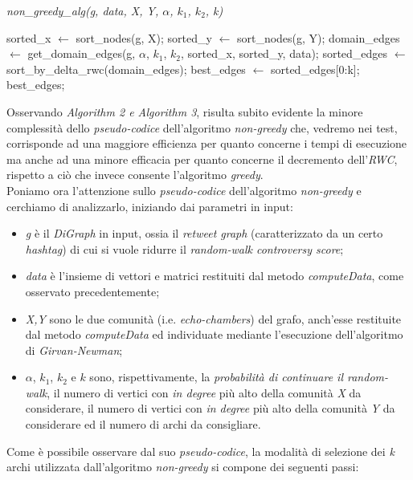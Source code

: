 \begin{algorithm}
\caption{\textit{non\_greedy\_alg(g, data, X, Y, $\alpha$, $k_1$, $k_2$, k)}}
\begin{algorithmic} 
\STATE sorted\_x $\leftarrow$ sort\_nodes(g, X); 
\STATE sorted\_y $\leftarrow$ sort\_nodes(g, Y);
\STATE domain\_edges $\leftarrow$ get\_domain\_edges(g, $\alpha$, $k_1$, $k_2$, sorted\_x, sorted\_y, data);
\STATE sorted\_edges $\leftarrow$ sort\_by\_delta\_rwc(domain\_edges);
\STATE best\_edges $\leftarrow$ sorted\_edges[0:k];
\RETURN best\_edges;
\end{algorithmic}
\end{algorithm}

Osservando \textit{Algorithm 2 e Algorithm 3}, risulta subito evidente la minore complessità dello \textit{pseudo-codice} dell'algoritmo \textit{non-greedy} che, vedremo nei test, corrisponde ad una maggiore efficienza per quanto concerne i tempi di esecuzione ma anche ad una minore efficacia per quanto concerne il decremento dell'\textit{RWC}, rispetto a ciò che invece consente l'algoritmo \textit{greedy}.
\\Poniamo ora l'attenzione sullo \textit{pseudo-codice} dell'algoritmo \textit{non-greedy} e cerchiamo di analizzarlo, iniziando dai parametri in input:
\begin{itemize}
\item \textit{g} è il \textit{DiGraph} in input, ossia il \textit{retweet graph} (caratterizzato da un certo \textit{hashtag}) di cui si vuole ridurre il \textit{random-walk controversy score}; 
\item \textit{data} è l'insieme di vettori e matrici restituiti dal metodo \textit{computeData}, come osservato precedentemente;
\item \textit{X,Y} sono le due comunità (i.e. \textit{echo-chambers}) del grafo, anch'esse restituite dal metodo \textit{computeData} ed individuate mediante l'esecuzione dell'algoritmo di \textit{Girvan-Newman};
\item $\alpha$, $k_1$, $k_2$ e $k$ sono, rispettivamente, la \textit{probabilità di continuare il random-walk}, il numero di vertici con \textit{in degree} più alto della comunità \textit{X} da considerare, il numero di vertici con \textit{in degree} più alto della comunità \textit{Y} da considerare ed il numero di archi da consigliare. 
\end{itemize}
Come è possibile osservare dal suo \textit{pseudo-codice}, la modalità di selezione dei \textit{k} archi utilizzata dall'algoritmo \textit{non-greedy} si compone dei seguenti passi:
